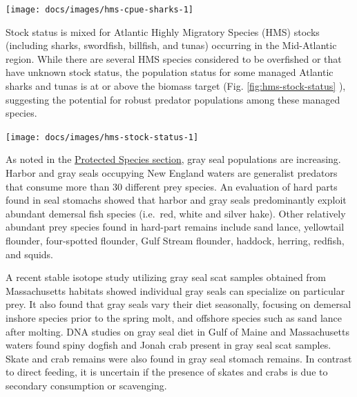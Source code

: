 \documentclass[
  10pt,
]{article}
\let\origfigure\figure
\let\endorigfigure\endfigure
\renewenvironment{figure}[1][2] {
    \expandafter\origfigure\expandafter[H]
} {
    \endorigfigure
}
\begin{document}
\begin{figure}

{\centering \texttt{[image: docs/images/hms-cpue-sharks-1]} 

}

\caption{Estimated number of sharks per unit effort from Highly Migratory Species Pelagic Observer Program data.}\label{fig:hms-cpue-sharks}
\end{figure}

Stock status is mixed for Atlantic Highly Migratory Species (HMS) stocks
(including sharks, swordfish, billfish, and tunas) occurring in the
Mid-Atlantic region. While there are several HMS species considered to
be overfished or that have unknown stock status, the population status
for some managed Atlantic sharks and tunas is at or above the biomass
target (Fig. \ref{fig:hms-stock-status} ), suggesting the potential for
robust predator populations among these managed species.

\begin{figure}

{\centering \texttt{[image: docs/images/hms-stock-status-1]} 

}

\caption{Summary of single species status for HMS stocks; key to species names at https://noaa-edab.github.io/tech-doc/atlantic-highly-migratory-species-stock-status.html.}\label{fig:hms-stock-status}
\end{figure}

As noted in the \protect\hyperlink{protected-species}{Protected Species
section}, gray seal populations are increasing. Harbor and gray seals
occupying New England waters are generalist predators that consume more
than 30 different prey species. An evaluation of hard parts found in
seal stomachs showed that harbor and gray seals predominantly exploit
abundant demersal fish species (i.e.~red, white and silver hake). Other
relatively abundant prey species found in hard-part remains include sand
lance, yellowtail flounder, four-spotted flounder, Gulf Stream flounder,
haddock, herring, redfish, and squids.

A recent stable isotope study utilizing gray seal scat samples obtained
from Massachusetts habitats showed individual gray seals can specialize
on particular prey. It also found that gray seals vary their diet
seasonally, focusing on demersal inshore species prior to the spring
molt, and offshore species such as sand lance after molting. DNA studies
on gray seal diet in Gulf of Maine and Massachusetts waters found spiny
dogfish and Jonah crab present in gray seal scat samples. Skate and crab
remains were also found in gray seal stomach remains. In contrast to
direct feeding, it is uncertain if the presence of skates and crabs is
due to secondary consumption or scavenging.
\end{document}
